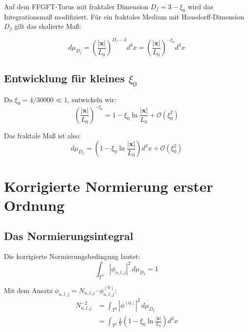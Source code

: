 Auf dem FFGFT-Torus mit fraktaler Dimension $D_f = 3-\xi_0$ wird
das Integrationsmaß modifiziert. Für ein fraktales Medium mit
Hausdorff-Dimension $D_f$ gilt das skalierte Maß:

\begin{equation}
  d\mu_{D_f} = \left(\frac{|\mathbf{x}|}{L_0}\right)^{D_f - 3} d^3x
  = \left(\frac{|\mathbf{x}|}{L_0}\right)^{-\xi_0} d^3x
  \label{eq:fraktales-mass}
\end{equation}

\subsection{Entwicklung für kleines \texorpdfstring{$\xi_0$}{xi0}}

Da $\xi_0 = 4/30000 \ll 1$, entwickeln wir:
\begin{equation}
  \left(\frac{|\mathbf{x}|}{L_0}\right)^{-\xi_0}
  = 1 - \xi_0 \ln\frac{|\mathbf{x}|}{L_0} + \mathcal{O}(\xi_0^2)
  \label{eq:entwicklung}
\end{equation}

Das fraktale Maß ist also:
\begin{equation}
  d\mu_{D_f} = \left(1 - \xi_0\ln\frac{|\mathbf{x}|}{L_0}\right)d^3x
  + \mathcal{O}(\xi_0^2)
  \label{eq:mass-entwickelt}
\end{equation}

\section{Korrigierte Normierung erster Ordnung}

\subsection{Das Normierungsintegral}

Die korrigierte Normierungsbedingung lautet:
\begin{equation}
  \int_{T^3}|\phi_{n,l,j}|^2\,d\mu_{D_f} = 1
\end{equation}

Mit dem Ansatz $\phi_{n,l,j} = N_{n,l,j} \cdot \phi^{(0)}_{n,l,j}$:
\begin{align}
  N_{n,l,j}^{-2}
  &= \int_{T^3}|\phi^{(0)}|^2\,d\mu_{D_f} \nonumber \\
  &= \int_{T^3}\frac{1}{V}\left(1 - \xi_0\ln\frac{|\mathbf{x}|}{L_0}\right)d^3x
  \label{eq:norm-integral}
\end{align}

